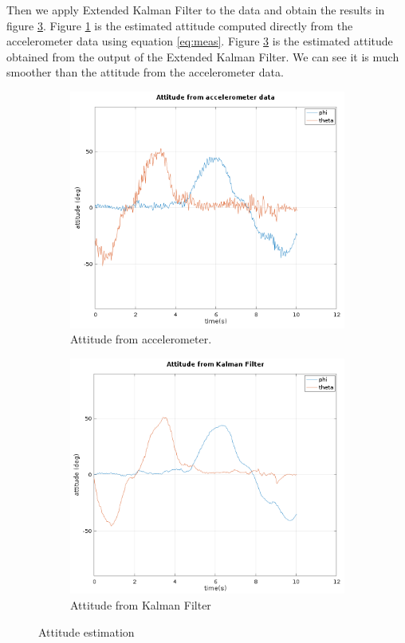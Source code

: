 Then we apply Extended Kalman Filter to the data and obtain the results in figure \ref{fig:kalman_results}. Figure \ref{fig:acc_attitude} is the estimated attitude computed directly from the accelerometer data using equation \ref{eq:meas}. Figure \ref{fig:kalman_results} is the estimated attitude obtained from the output of the Extended Kalman Filter. We can see it is much smoother than the attitude from the accelerometer data.

\begin{figure}[h]
\centering
\begin{subfigure}[b]{0.45\textwidth}
    \includegraphics[width=\textwidth]{figures/acc_attitude.png}
    \caption{Attitude from accelerometer.}
    \label{fig:acc_attitude}
\end{subfigure}
\begin{subfigure}[b]{0.45\textwidth}
    \includegraphics[width=\textwidth]{figures/attitude_kalman.png}
    \caption{Attitude from Kalman Filter}
    \label{fig:attitude_kalman}
\end{subfigure}
\caption{Attitude estimation}
\label{fig:kalman_results}
\end{figure}
